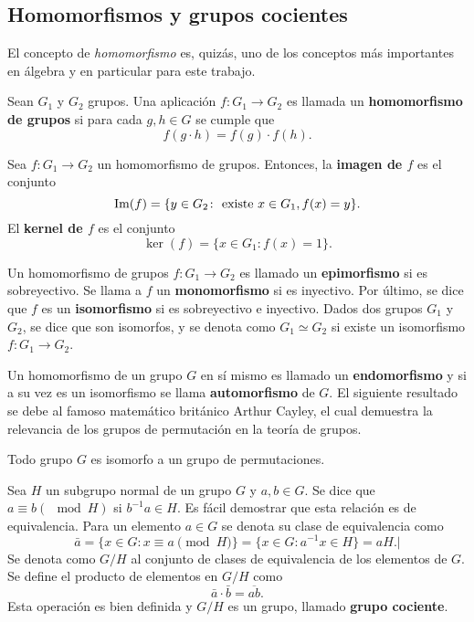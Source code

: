\subsection{Homomorfismos y grupos cocientes}
El concepto de \textit{homomorfismo} es, quizás, uno de los conceptos más importantes en álgebra y en particular para este trabajo.
\begin{definicion}
Sean $G_1$ y $G_2 $ grupos. Una aplicación $f \colon G_1 \to G_2$ es llamada un \textbf{homomorfismo de grupos} si para cada $g, h \in G$ se cumple que \[ f(g \cdot h) = f(g) \cdot f(h) . \]
\end{definicion}
\begin{definicion}
Sea $f \colon G_1 \to G_2$ un homomorfismo de grupos. Entonces, la \textbf{imagen de $f$} es el conjunto \[ \operatorname{Im}(f) = \{ y \in G_2 \colon \mbox{ existe }x \in G_1, f(x) =y \}. \]
El \textbf{kernel de $f$} es el conjunto \[ \ker(f) =  \{ x \in G_1 \colon f(x) = 1 \}.\] 
\end{definicion}
\begin{definicion}
Un homomorfismo de grupos $f \colon G_1 \to G_2$ es llamado un \textbf{epimorfismo} si es sobreyectivo. Se llama a $f$ un \textbf{monomorfismo} si es inyectivo. Por último, se dice que $f$ es un  \textbf{isomorfismo} si es sobreyectivo e inyectivo. Dados dos grupos $G_1$ y $G_2$, se dice que son isomorfos, y se denota como $G_1 \simeq G_2$ si existe un isomorfismo $f \colon G_1 \to G_2$. 
\end{definicion} 
Un homomorfismo de un grupo $G$ en sí mismo es llamado un \textbf{endomorfismo} y si a su vez es un isomorfismo se llama  \textbf{automorfismo} de $G$. 
El siguiente resultado se debe al famoso matemático británico Arthur Cayley, el cual demuestra la relevancia de los grupos de permutación en la teoría de grupos.
\begin{teorema}[Cayley]
Todo grupo $G$ es isomorfo a un grupo de permutaciones.
\end{teorema}
\begin{definicion}
Sea $H$ un subgrupo normal de un grupo $G$ y $a, b \in G$. Se dice que $a\equiv b(\mod{H})$ si $b^{-1}a \in H$. Es fácil demostrar que esta relación es de equivalencia. Para un elemento $a \in G$ se denota su clase de equivalencia como \[ \bar{a} = \{ x \in G \colon x \equiv a \pmod{H}  \} = \{ x \in G \colon a^{-1}x \in H \} = aH. | \]
Se denota como $G/H$ al conjunto de clases de equivalencia de los elementos de $G$. Se define el producto de elementos en $G/H$ como \[ \bar{a}\cdot \bar{b} = \overline{ab}. \] Esta operación es bien definida y $G/H$ es un grupo, llamado \textbf{grupo cociente}. 
\end{definicion}
